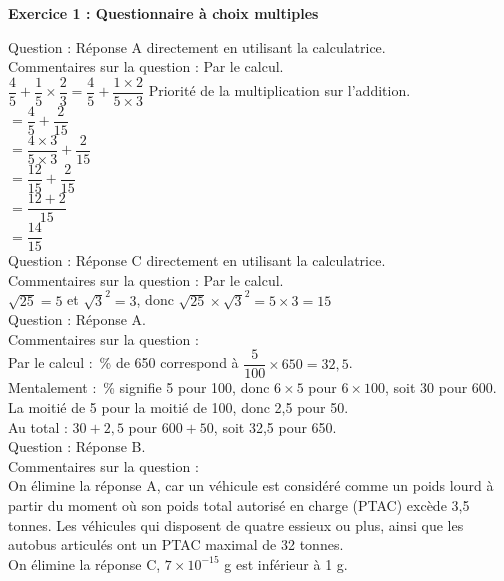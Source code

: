\textbf{Exercice 1 :  Questionnaire à  choix multiples}

\medskip


Question  : Réponse A directement en utilisant la calculatrice. \\
Commentaires sur la question  : Par le calcul.\\[2mm]
$\dfrac{4}{5} + \dfrac{1}{5}\times \dfrac{2}{3}=\dfrac{4}{5} + \dfrac{1\times2}{5\times 3}$ \quad Priorité de la multiplication sur l'addition. \\[2mm]
 $=\dfrac{4}{5} + \dfrac{2}{15}$ \\[2mm]
 $=\dfrac{4\times 3}{5\times 3} + \dfrac{2}{15}$  \\[2mm]
 $=\dfrac{12}{15} + \dfrac{2}{15}$  \\[2mm]
 $=\dfrac{12+2}{15}$  \\[2mm]
 $=\dfrac{14}{15}$  \\[2mm]

Question  : Réponse C directement en utilisant la calculatrice.\\
Commentaires sur la question  : Par le calcul.\\[2mm]
$\sqrt{25}=5$ et $\sqrt{3}^2 =3$, donc $\sqrt{25} \times \sqrt{3}^2 =5 \times 3=15$ \\

Question  : Réponse A.\\
Commentaires sur la question  : \\
Par le calcul : \,\% de 650 correspond à $\dfrac{5}{100}\times650=32,5$. \\[2mm]
Mentalement : \,\% signifie 5 pour 100, donc $6\times5$ pour $6\times100$, soit 30 pour 600. \\
\phantom{Mentalement : \quad} La moitié de 5 pour la moitié de 100, donc 2,5 pour 50.\\
Au total : $30+2,5$ pour $600+50$, soit 32,5 pour 650. \\

Question  : Réponse B.\\
Commentaires sur la question  : \\
On élimine la réponse A, car un véhicule est considéré comme un poids lourd à partir du moment où son poids total autorisé en charge (PTAC) excède 3,5 tonnes. Les véhicules qui disposent de quatre essieux ou plus, ainsi que les autobus articulés ont un PTAC maximal de 32 tonnes. \\
On élimine la réponse C, $7 \times 10^{-15}$ g est inférieur à 1 g.

\medskip

\vspace{0,5cm}


